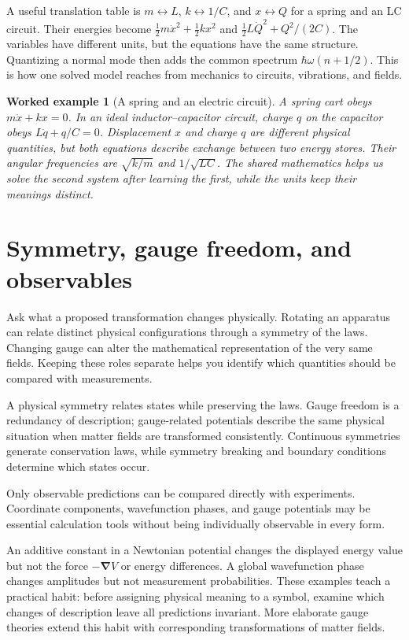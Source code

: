 \documentclass[11pt,oneside]{book}
\newcommand{\grad}{\boldsymbol{\nabla}}
\theoremstyle{reviewstyle}
\newtheorem{example}{Worked example}[chapter]
\begin{document}
A useful translation table is $m\leftrightarrow L$, $k\leftrightarrow1/C$, and $x\leftrightarrow Q$ for a spring and an LC circuit. Their energies become $\tfrac12m\dot x^2+\tfrac12kx^2$ and $\tfrac12L\dot Q^2+Q^2/(2C)$. The variables have different units, but the equations have the same structure. Quantizing a normal mode then adds the common spectrum $\hbar\omega(n+1/2)$. This is how one solved model reaches from mechanics to circuits, vibrations, and fields.

\begin{example}[A spring and an electric circuit]
A spring cart obeys $m\ddot x+kx=0$. In an ideal inductor--capacitor circuit, charge $q$ on the capacitor obeys $L\ddot q+q/C=0$. Displacement $x$ and charge $q$ are different physical quantities, but both equations describe exchange between two energy stores. Their angular frequencies are $\sqrt{k/m}$ and $1/\sqrt{LC}$. The shared mathematics helps us solve the second system after learning the first, while the units keep their meanings distinct.
\end{example}

\section{Symmetry, gauge freedom, and observables}
Ask what a proposed transformation changes physically. Rotating an apparatus can relate distinct physical configurations through a symmetry of the laws. Changing gauge can alter the mathematical representation of the very same fields. Keeping these roles separate helps you identify which quantities should be compared with measurements.

A physical symmetry relates states while preserving the laws. Gauge freedom is a redundancy of description; gauge-related potentials describe the same physical situation when matter fields are transformed consistently. Continuous symmetries generate conservation laws, while symmetry breaking and boundary conditions determine which states occur.

Only observable predictions can be compared directly with experiments. Coordinate components, wavefunction phases, and gauge potentials may be essential calculation tools without being individually observable in every form.

An additive constant in a Newtonian potential changes the displayed energy value but not the force $-\grad V$ or energy differences. A global wavefunction phase changes amplitudes but not measurement probabilities. These examples teach a practical habit: before assigning physical meaning to a symbol, examine which changes of description leave all predictions invariant. More elaborate gauge theories extend this habit with corresponding transformations of matter fields.
\end{document}
